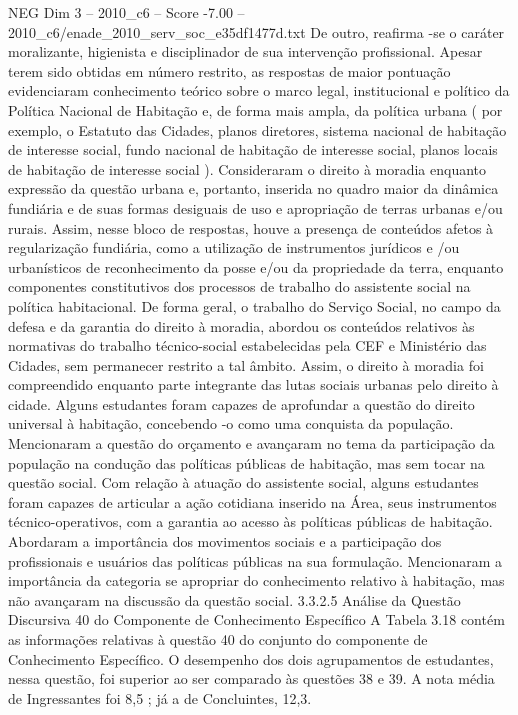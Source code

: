 \begin{textsample}{NEG Dim 3 – 2010\_c6 – Score -7.00 – 2010\_c6/enade\_2010\_serv\_soc\_e35df1477d.txt}
De outro, reafirma -se o caráter moralizante, higienista e disciplinador de sua intervenção profissional.
Apesar terem sido obtidas em número restrito, as respostas de maior pontuação evidenciaram conhecimento teórico sobre o marco legal, institucional e político da Política Nacional de Habitação e, de forma mais ampla, da política urbana ( por exemplo, o Estatuto das Cidades, planos diretores, sistema nacional de habitação de interesse social, fundo nacional de habitação de interesse social, planos locais de habitação de interesse social ).
Consideraram o direito à moradia enquanto expressão da questão urbana e, portanto, inserida no quadro maior da dinâmica fundiária e de suas formas desiguais de uso e apropriação de terras urbanas e/ou rurais.
Assim, nesse bloco de respostas, houve a presença de conteúdos afetos à regularização fundiária, como a utilização de instrumentos jurídicos e /ou urbanísticos de reconhecimento da posse e/ou da propriedade da terra, enquanto componentes constitutivos dos processos de trabalho do assistente social na política habitacional.
De forma geral, o trabalho do Serviço Social, no campo da defesa e da garantia do direito à moradia, abordou os conteúdos relativos às normativas do trabalho técnico-social estabelecidas pela CEF e Ministério das Cidades, sem permanecer restrito a tal âmbito.
Assim, o direito à moradia foi compreendido enquanto parte integrante das lutas sociais urbanas pelo direito à cidade.
Alguns estudantes foram capazes de aprofundar a questão do direito universal à habitação, concebendo -o como uma conquista da população.
Mencionaram a questão do orçamento e avançaram no tema da participação da população na condução das políticas públicas de habitação, mas sem tocar na questão social.
Com relação à atuação do assistente social, alguns estudantes foram capazes de articular a ação cotidiana inserido na Área, seus instrumentos técnico-operativos, com a garantia ao acesso às políticas públicas de habitação.
Abordaram a importância dos movimentos sociais e a participação dos profissionais e usuários das políticas públicas na sua formulação.
Mencionaram a importância da categoria se apropriar do conhecimento relativo à habitação, mas não avançaram na discussão da questão social. 3.3.2.5 Análise da Questão Discursiva 40 do Componente de Conhecimento Específico A Tabela 3.18 contém as informações relativas à questão 40 do conjunto do componente de Conhecimento Específico.
O desempenho dos dois agrupamentos de estudantes, nessa questão, foi superior ao ser comparado às questões 38 e 39.
A nota média de Ingressantes foi 8,5 ; já a de Concluintes, 12,3.

\end{textsample}
